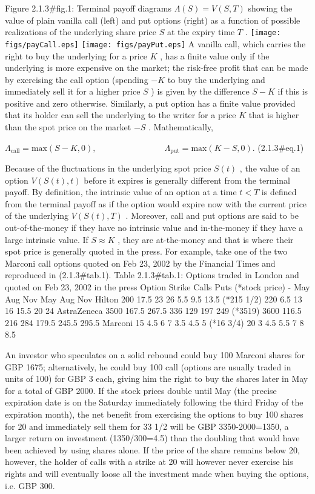 Figure 2.1.3#fig.1: Terminal payoff diagrams  $ \Lambda (S)=V(S,T)$ showing the value of plain vanilla call (left) and put options (right) as a function of possible realizations of the underlying share price $ S$ at the expiry time $ T$ .
\texttt{[image: figs/payCall.eps]}        \texttt{[image: figs/payPut.eps]}
A vanilla call, which carries the right to buy the underlying for a price $ K$ , has a finite value only if the underlying is more expensive on the market; the risk-free profit that can be made by exercising the call option (spending  $ -K$ to buy the underlying and immediately sell it for a higher price $ S$ ) is given by the difference $ S-K$ if this is positive and zero otherwise. Similarly, a put option has a finite value provided that its holder can sell the underlying to the writer for a price $ K$ that is higher than the spot price on the market $ -S$ . Mathematically,

 $\displaystyle \Lambda_\mathrm{call}=\mathrm{max}(S-K,0), \qquad\qquad\qquad\qquad \Lambda_\mathrm{put}=\mathrm{max}(K-S,0).$	 (2.1.3#eq.1)

Because of the fluctuations in the underlying spot price $ S(t)$ , the value of an option $ V(S(t),t)$ before it expires is generally different from the terminal payoff. By definition, the intrinsic value of an option at a time $ t<T$ is defined from the terminal payoff as if the option would expire now with the current price of the underlying $ V(S(t),T)$ . Moreover, call and put options are said to be out-of-the-money if they have no intrinsic value and in-the-money if they have a large intrinsic value. If  $ S\approx K$ , they are at-the-money and that is where their spot price is generally quoted in the press. For example, take one of the two Marconi call options quoted on Feb 23, 2002 by the Financial Times and reproduced in (2.1.3#tab.1). 
Table 2.1.3#tab.1: Options traded in London and quoted on Feb 23, 2002 in the press
Option	 Strike	Calls	Puts
(*stock price)	 -	 May	 Aug	 Nov	 May	 Aug	 Nov
Hilton	 200	 17.5	 23	 26	 5.5	 9.5	 13.5
(*215 1/2)	 220	 6.5	 13	 16	 15.5	 20	 24
AstraZeneca	 3500	 167.5	 267.5	 336	 129	 197	 249
(*3519)	 3600	 116.5	 216	 284	 179.5	 245.5	 295.5
Marconi	 15	 4.5	 6	 7	 3.5	 4.5	 5
(*16 3/4)	 20	 3	 4.5	 5.5	 7	 8	 8.5

An investor who speculates on a solid rebound could buy 100 Marconi shares for GBP 1675; alternatively, he could buy 100 call (options are usually traded in units of 100) for GBP 3 each, giving him the right to buy the shares later in May for a total of GBP 2000. If the stock prices double until May (the precise expiration date is on the Saturday immediately following the third Friday of the expiration month), the net benefit from exercising the options to buy 100 shares for 20 and immediately sell them for 33 1/2 will be GBP 3350-2000=1350, a larger return on investment (1350/300=4.5) than the doubling that would have been achieved by using shares alone. If the price of the share remains below 20, however, the holder of calls with a strike at 20 will however never exercise his rights and will eventually loose all the investment made when buying the options, i.e. GBP 300.


